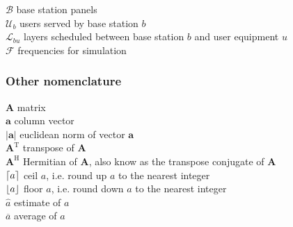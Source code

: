 $\mathcal{B}$ \mytab base station panels\\
$\mathcal{U}_b$ \mytab users served by base station $b$\\ 
$\mathcal{L}_{bu}$ \mytab layers scheduled between base station $b$ and user equipment $u$\\
$\mathcal{F}$ \mytab frequencies for simulation\\


\subsubsection*{Other nomenclature}


$\bm{A}$ \mytab matrix\\
$\bm{a}$ \mytab column vector\\
$|\bm{a}|$ \mytab euclidean norm of vector $\bm{a}$\\
$\bm{A}^\text{T}$ \mytab transpose of $\bm{A}$\\
$\bm{A}^\text{H}$ \mytab Hermitian of $\bm{A}$, also know as the transpose conjugate of $\bm{A}$\\
$\lceil a\rceil$ \mytab ceil $a$, i.e. round up $a$ to the nearest integer\\
$\lfloor a\rfloor$ \mytab floor $a$, i.e. round down $a$ to the nearest integer \\
$\hat{a}$ \mytab estimate of $a$\\
$\overline{a}$ \mytab average of $a$\\

\clearpage
\thispagestyle{empty}


\cleardoublepage
 \setcounter{page}{1}
\baselineskip 18pt